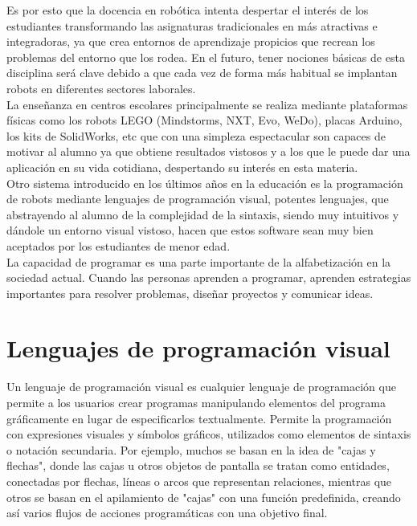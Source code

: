 Es por esto que la docencia en robótica intenta despertar el interés de los estudiantes transformando las asignaturas tradicionales en más atractivas e integradoras, ya que crea entornos de aprendizaje propicios que recrean los problemas del entorno que los rodea. En el futuro, tener nociones básicas de esta disciplina será clave debido a que cada vez de forma más habitual se implantan robots en diferentes sectores laborales.\\

La enseñanza en centros escolares principalmente se realiza mediante plataformas físicas como los robots LEGO (Mindstorms, NXT, Evo, WeDo), placas Arduino, los kits de SolidWorks, etc que con una simpleza espectacular son capaces de motivar al alumno ya que obtiene resultados vistosos y a los que le puede dar una aplicación en su vida cotidiana, despertando su interés en esta materia.\\
Otro sistema introducido en los últimos años en la educación es la programación de robots mediante lenguajes de programación visual, potentes lenguajes, que abstrayendo al alumno de la complejidad de la sintaxis, siendo muy intuitivos y dándole un entorno visual vistoso, hacen que estos software sean muy bien aceptados por los estudiantes de menor edad.\\

La capacidad de programar es una parte importante de la alfabetización en la sociedad actual. Cuando las personas aprenden a programar, aprenden estrategias importantes para resolver problemas, diseñar proyectos y comunicar ideas.

\section{Lenguajes de programación visual}
\label{sec:lenguajes}

Un lenguaje de programación visual es cualquier lenguaje de programación que permite a los usuarios crear programas manipulando elementos del programa gráficamente en lugar de especificarlos textualmente. Permite la programación con expresiones visuales y símbolos gráficos, utilizados como elementos de sintaxis o notación secundaria. Por ejemplo, muchos se basan en la idea de "cajas y flechas", donde las cajas u otros objetos de pantalla se tratan como entidades, conectadas por flechas, líneas o arcos que representan relaciones, mientras que otros se basan en el apilamiento de "cajas" con una función predefinida, creando así varios flujos de acciones programáticas con una objetivo final.\\

